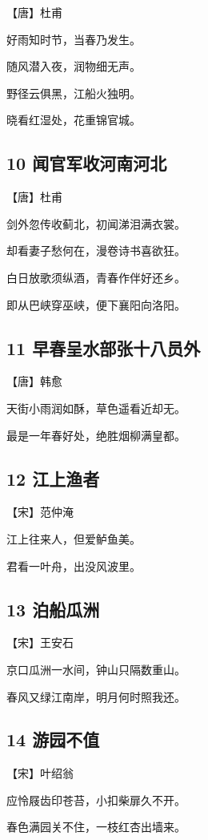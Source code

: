 \documentclass[a6paper, 12pt]{article}
\begin{document}
【唐】杜甫

好雨知时节，当春乃发生。

随风潜入夜，润物细无声。

野径云俱黑，江船火独明。

晓看红湿处，花重锦官城。

\subsection*{10 闻官军收河南河北}

【唐】杜甫

剑外忽传收蓟北，初闻涕泪满衣裳。

却看妻子愁何在，漫卷诗书喜欲狂。

白日放歌须纵酒，青春作伴好还乡。

即从巴峡穿巫峡，便下襄阳向洛阳。

\subsection*{11 早春呈水部张十八员外}

【唐】韩愈

天街小雨润如酥，草色遥看近却无。

最是一年春好处，绝胜烟柳满皇都。

\subsection*{12 江上渔者}

【宋】范仲淹

江上往来人，但爱鲈鱼美。

君看一叶舟，出没风波里。

\subsection*{13 泊船瓜洲}

【宋】王安石

京口瓜洲一水间，钟山只隔数重山。

春风又绿江南岸，明月何时照我还。

\subsection*{14 游园不值}

【宋】叶绍翁

应怜屐齿印苍苔，小扣柴扉久不开。

春色满园关不住，一枝红杏出墙来。
\end{document}
